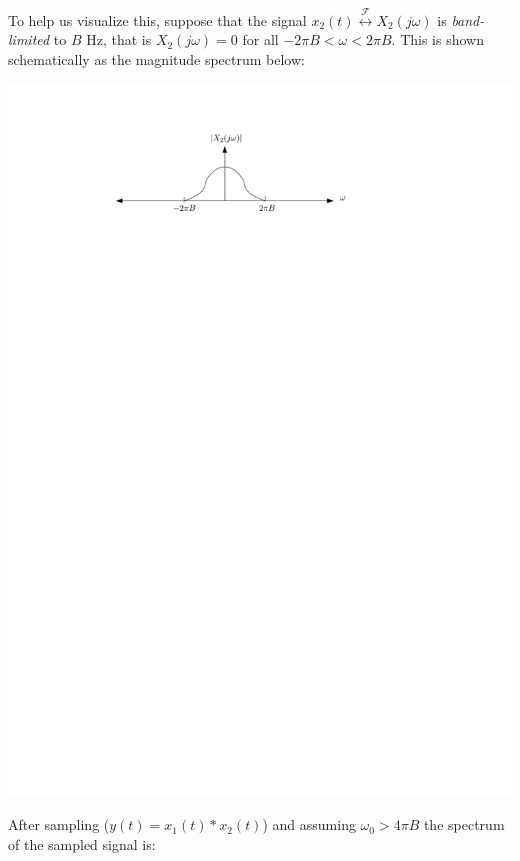 To help us visualize this, suppose that the signal $x_2(t)  \stackrel{\mathcal{F}}{\longleftrightarrow} X_2(j\omega)$ is \emph{band-limited} to $B$ Hz, that is $X_2(j\omega) = 0$ for all $-2\pi B < \omega < 2\pi B$. This is shown schematically as the magnitude spectrum below:

\begin{center}
  \includegraphics[scale=1]{graphics/bandlimited.pdf}
\end{center}
After sampling ($y(t) = x_1(t)*x_2(t)$) and assuming $\omega_0 > 4\pi B$ the spectrum of the sampled signal is:
